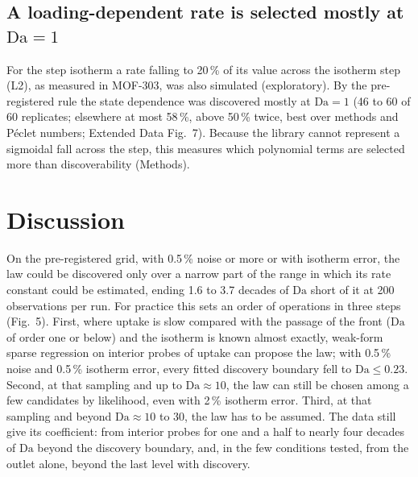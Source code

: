 \documentclass[11pt]{article}
\newcommand{\Da}{\mathrm{Da}}
\begin{document}
\subsection*{A loading-dependent rate is selected mostly at $\Da = 1$}
For the step isotherm a rate falling to 20\,\% of its value across the isotherm step (L2), as
measured in MOF-303, was also simulated (exploratory). By the pre-registered rule the state dependence
was discovered mostly at $\Da = 1$ (46 to 60 of 60 replicates; elsewhere at most 58\,\%, above
50\,\% twice,
best over methods and P\'eclet numbers; Extended Data Fig.~7). Because the library cannot
represent a sigmoidal fall across the step, this measures which polynomial terms are selected more than
discoverability (Methods).

\section*{Discussion}
On the pre-registered grid, with 0.5\,\% noise or more or with isotherm error, the law could be discovered only over a narrow part of the range in which its rate constant could be
estimated, ending 1.6 to 3.7 decades of $\Da$ short of it at 200 observations per run. For practice this sets an order of operations in three steps (Fig.~5). First, where
uptake is slow compared with the passage of the front ($\Da$ of order one or below) and the
isotherm is known almost exactly, weak-form sparse regression on interior probes of uptake can propose the law; with 0.5\,\% noise and 0.5\,\% isotherm error, every fitted discovery boundary fell to $\Da \le 0.23$.
Second, at that sampling and up to $\Da \approx 10$, the law can still be chosen among a few candidates by likelihood,
even with 2\,\% isotherm error. Third, at that sampling and beyond $\Da \approx 10$ to 30, the law has to be assumed. The data
still give its coefficient: from interior probes for one and a half to nearly four decades of
$\Da$ beyond the discovery boundary, and, in the few conditions tested, from the outlet alone,
beyond the last level with discovery.
\end{document}
